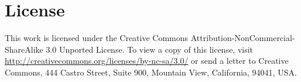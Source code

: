 \documentclass[10pt]{article}
\begin{document}
\section{License}
This work is licensed under the Creative Commons Attribution-NonCommercial-ShareAlike 3.0 Unported License. To view a copy of this license, visit \url{http://creativecommons.org/licenses/by-nc-sa/3.0/} or send a letter to Creative Commons, 444 Castro Street, Suite 900, Mountain View, California, 94041, USA.



\end{document}
